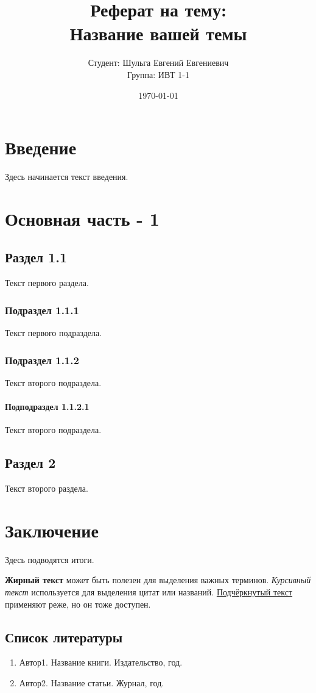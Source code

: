 \documentclass[14pt]{extreport}
\title{Реферат на тему: \\[0.5cm] \textbf{Название вашей темы}}
\author{Студент: Шульга Евгений Евгениевич \\ Группа: ИВТ 1-1}
\date{\today}
\begin{document}
	
	\maketitle
	\tableofcontents
	
	\chapter{Введение}
	Здесь начинается текст введения.
	
	\chapter{Основная часть - 1}
	\section{Раздел 1.1}
	Текст первого раздела.
	
	\subsection{Подраздел 1.1.1}
	Текст первого подраздела.
	
	\subsection{Подраздел 1.1.2}
	Текст второго подраздела.
	
	\subsubsection{Подподраздел 1.1.2.1}
	Текст второго подраздела.
	
	\section{Раздел 2}
	Текст второго раздела.
	
	\chapter{Заключение}
	Здесь подводятся итоги.
	
	\textbf{Жирный текст} может быть полезен для выделения важных терминов. 
	\textit{Курсивный текст} используется для выделения цитат или названий. 
	\underline{Подчёркнутый текст} применяют реже, но он тоже доступен.
	
	\section{Список литературы}
	\begin{enumerate}
		\item Автор1. Название книги. Издательство, год.
		\item Автор2. Название статьи. Журнал, год.
	\end{enumerate}
	
\end{document}
